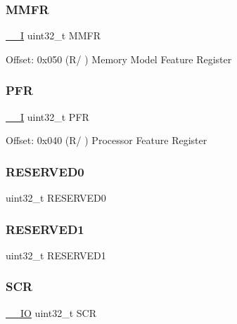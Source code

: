 \subsubsection{\texorpdfstring{MMFR}{MMFR}}
{\footnotesize\ttfamily \mbox{\hyperlink{core__sc300_8h_af63697ed9952cc71e1225efe205f6cd3}{\+\_\+\+\_\+I}} uint32\+\_\+t M\+M\+FR}

Offset\+: 0x050 (R/ ) Memory Model Feature Register \mbox{\label{struct_s_c_b___type_a0c3c74d90886d6f470882c63c0e60bfe}} 
\subsubsection{\texorpdfstring{PFR}{PFR}}
{\footnotesize\ttfamily \mbox{\hyperlink{core__sc300_8h_af63697ed9952cc71e1225efe205f6cd3}{\+\_\+\+\_\+I}} uint32\+\_\+t P\+FR}

Offset\+: 0x040 (R/ ) Processor Feature Register \mbox{\label{struct_s_c_b___type_af86c61a5d38a4fc9cef942a12744486b}} 
\subsubsection{\texorpdfstring{RESERVED0}{RESERVED0}}
{\footnotesize\ttfamily uint32\+\_\+t R\+E\+S\+E\+R\+V\+E\+D0}

\mbox{\label{struct_s_c_b___type_ac4ac04e673b5b8320d53f7b0947db902}} 
\subsubsection{\texorpdfstring{RESERVED1}{RESERVED1}}
{\footnotesize\ttfamily uint32\+\_\+t R\+E\+S\+E\+R\+V\+E\+D1}

\mbox{\label{struct_s_c_b___type_a64a95891ad3e904dd5548112539c1c98}} 
\subsubsection{\texorpdfstring{SCR}{SCR}}
{\footnotesize\ttfamily \mbox{\hyperlink{core__sc300_8h_aec43007d9998a0a0e01faede4133d6be}{\+\_\+\+\_\+\+IO}} uint32\+\_\+t S\+CR}

